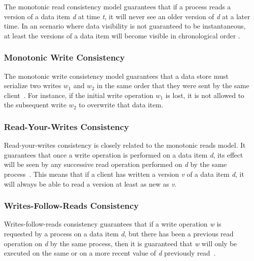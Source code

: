 The monotonic read consistency model guarantees that if a process reads a version of a data item \textit{d} at time \textit{t}, it will never see an older version of \textit{d} at a later time. In an scenario where data visibility is not guaranteed to be instantaneous, at least the versions of a data item will become visible in chronological order \cite{tanenbaum:2007, Vogels:2009}.
\vspace{1mm}

\subsubsection{Monotonic Write Consistency}

The monotonic write consistency model guarantees that a data store must serialize two writes \textit{$w_{1}$} and \textit{$w_{2}$} in the same order that they were sent by the same client~\cite{tanenbaum:2007, Vogels:2009}. For instance, if the initial write operation \textit{$w_{1}$} is lost, it is not allowed to the subsequent write \textit{$w_{2}$} to overwrite that data item.
\vspace{1mm}

\subsubsection{Read-Your-Writes Consistency}

Read-your-writes consistency is closely related to the monotonic reads model. It guarantees that once a write operation is performed on a data item \textit{d}, its effect will be seen by any successive read operation performed on \textit{d} by the same process~\cite{tanenbaum:2007, Vogels:2009}. This means that if a client has written a version \textit{v} of a data item \textit{d}, it will always be able to read a version at least as new as \textit{v}. 
\vspace{1mm}

\subsubsection{Writes-Follow-Reads Consistency}

Writes-follow-reads consistency guarantees that if a write operation \textit{w} is requested by a process on a data item \textit{d}, but there has been a previous read operation on \textit{d} by the same process, then it is guaranteed that \textit{w} will only be executed on the same or on a more recent value of \textit{d} previously read~\cite{tanenbaum:2007}.
\vspace{3mm}


